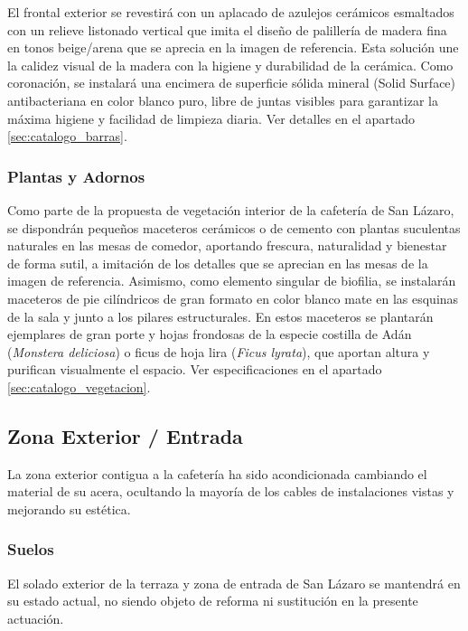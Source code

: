 \documentclass[12pt,a4paper]{article}
\begin{document}
El frontal exterior se revestirá con un aplacado de azulejos cerámicos esmaltados con un relieve listonado vertical que imita el diseño de palillería de madera fina en tonos beige/arena que se aprecia en la imagen de referencia. Esta solución une la calidez visual de la madera con la higiene y durabilidad de la cerámica. Como coronación, se instalará una encimera de superficie sólida mineral (Solid Surface) antibacteriana en color blanco puro, libre de juntas visibles para garantizar la máxima higiene y facilidad de limpieza diaria. Ver detalles  en el apartado \ref{sec:catalogo_barras}.

\subsubsection{Plantas y Adornos}
Como parte de la propuesta de vegetación interior de la cafetería de San Lázaro, se dispondrán pequeños maceteros cerámicos o de cemento con plantas suculentas naturales en las mesas de comedor, aportando frescura, naturalidad y bienestar de forma sutil, a imitación de los detalles que se aprecian en las mesas de la imagen de referencia. Asimismo, como elemento singular de biofilia, se instalarán maceteros de pie cilíndricos de gran formato en color blanco mate en las esquinas de la sala y junto a los pilares estructurales. En estos maceteros se plantarán ejemplares de gran porte y hojas frondosas de la especie costilla de Adán (\textit{Monstera deliciosa}) o ficus de hoja lira (\textit{Ficus lyrata}), que aportan altura y purifican visualmente el espacio. Ver especificaciones en el apartado \ref{sec:catalogo_vegetacion}.

\subsection{Zona Exterior / Entrada}
La zona exterior contigua a la cafetería ha sido acondicionada cambiando el material de su acera, ocultando la mayoría de los cables de instalaciones vistas y mejorando su estética.


\subsubsection{Suelos}
El solado exterior de la terraza y zona de entrada de San Lázaro se mantendrá en su estado actual, no siendo objeto de reforma ni sustitución en la presente actuación.
\end{document}
